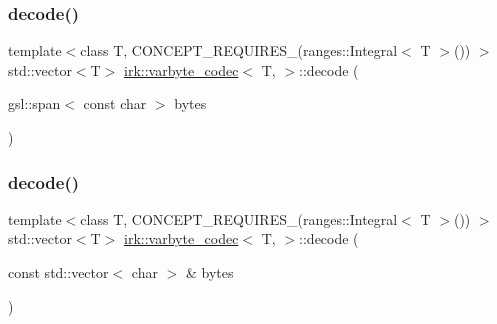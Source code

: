 \subsubsection{\texorpdfstring{decode()}{decode()}\hspace{0.1cm}{\footnotesize\ttfamily [2/3]}}
{\footnotesize\ttfamily template$<$class T, C\+O\+N\+C\+E\+P\+T\+\_\+\+R\+E\+Q\+U\+I\+R\+E\+S\+\_\+(ranges\+::\+Integral$<$ T $>$()) $>$ \\
std\+::vector$<$T$>$ \mbox{\hyperlink{structirk_1_1varbyte__codec}{irk\+::varbyte\+\_\+codec}}$<$ T, $>$\+::decode (\begin{DoxyParamCaption}\item[{gsl\+::span$<$ const char $>$}]{bytes }\end{DoxyParamCaption})\hspace{0.3cm}{\ttfamily [inline]}}

\mbox{\label{structirk_1_1varbyte__codec_a416c6640c688c798dc5de3b99c58121d}} 
\subsubsection{\texorpdfstring{decode()}{decode()}\hspace{0.1cm}{\footnotesize\ttfamily [3/3]}}
{\footnotesize\ttfamily template$<$class T, C\+O\+N\+C\+E\+P\+T\+\_\+\+R\+E\+Q\+U\+I\+R\+E\+S\+\_\+(ranges\+::\+Integral$<$ T $>$()) $>$ \\
std\+::vector$<$T$>$ \mbox{\hyperlink{structirk_1_1varbyte__codec}{irk\+::varbyte\+\_\+codec}}$<$ T, $>$\+::decode (\begin{DoxyParamCaption}\item[{const std\+::vector$<$ char $>$ \&}]{bytes }\end{DoxyParamCaption})\hspace{0.3cm}{\ttfamily [inline]}}

\mbox{\label{structirk_1_1varbyte__codec_a404c53206361afe9e8e921a8b5241643}} 
